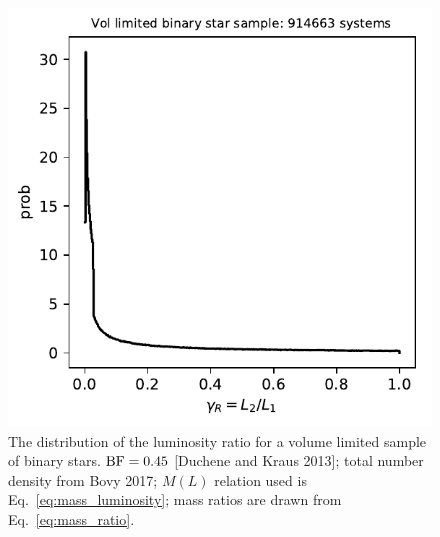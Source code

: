 \documentclass{emulateapj}
\begin{document}
\begin{figure}[!t]
	\begin{center}
		\includegraphics[scale=.8]{figures/gammaR_distribn_vol_limited.pdf}
	\end{center}
	\caption{The distribution of the luminosity ratio for a volume limited 
	sample of binary stars. ${\rm BF} = 0.45$ [Duchene and Kraus 2013]; total 
	number density from Bovy 2017; $M(L)$ relation used is 
	Eq.~\ref{eq:mass_luminosity}; mass ratios are drawn from 
	Eq.~\ref{eq:mass_ratio}.}
	\label{fig:gammaR_distribn_vol_limited}
\end{figure}
\end{document}
